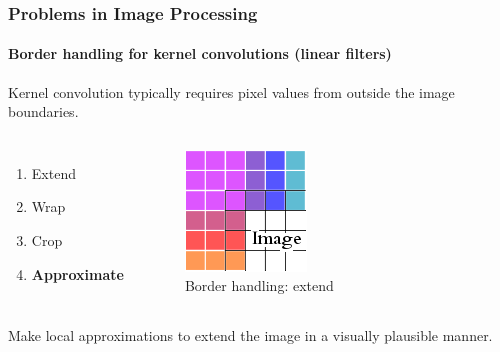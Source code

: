 \documentclass{beamer}
\begin{document}
\begin{frame}
\frametitle{Problems in Image Processing}
\framesubtitle{Border handling for kernel convolutions (linear filters)}

Kernel convolution typically requires pixel values from outside the image boundaries.

\begin{columns}[c] %
\begin{enumerate}
	\item Extend
	\item Wrap
	\item Crop
	\item \textbf{Approximate} 
\end{enumerate}
\begin{figure} %
\centering
	\includegraphics[width=0.3\columnwidth]{../figures/Extend_Edge-Handling}
\caption{Border handling: extend}
\end{figure}
\end{columns}

Make \alert{local} approximations to extend the image in a visually plausible manner.

\end{frame}

\end{document}
